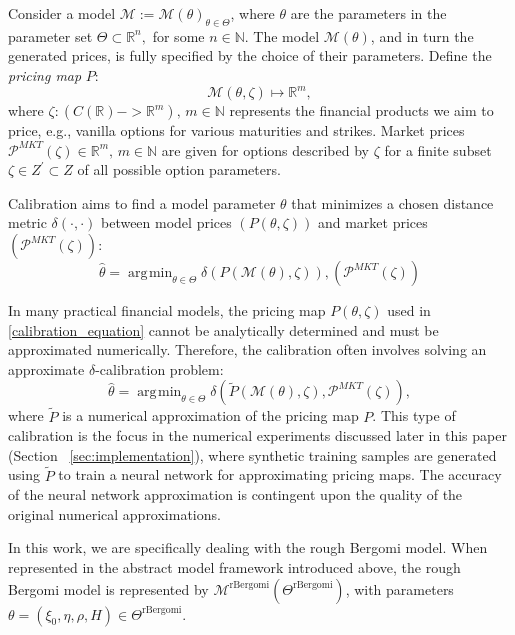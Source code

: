 \documentclass{article}
\theoremstyle{remark}
\DeclareMathOperator*{\argmin}{\arg\!\min}
\begin{document}
Consider a model $\mathcal{M} := \mathcal{M}(\theta)_{\theta \in \Theta}$, where $\theta$ are the parameters
in the parameter set $\Theta \subset \mathbb{R}^n,$ for some $n \in \mathbb{N}$.
The model $\mathcal{M}(\theta)$, and in turn the generated prices, is fully specified by the choice of their parameters.
Define the \emph{pricing map} $P$:
\begin{equation*}
\mathcal{M}(\theta, \zeta) \mapsto \mathbb{R}^m,
\end{equation*}
where $\zeta: (C(\mathbb{R}) -> \mathbb{R}^m), \,m \in \mathbb{N}$ represents the financial products we aim to price,
e.g., vanilla options for various maturities and strikes.
Market prices $\mathcal{P}^{MKT}(\zeta) \in \mathbb{R}^m, \, m \in \mathbb{N}$ are given for options described by $\zeta$ for a finite subset
$\zeta \in Z^\prime \subset Z$ of all possible option parameters.

Calibration aims to find a model parameter $\theta$ that minimizes a chosen distance metric $\delta(\cdot, \cdot)$
between model prices $\left( P(\theta, \zeta) \right)$
and market prices $\left(\mathcal{P}^{MKT}(\zeta) \right)$:
\begin{equation}\label{calibration_equation}
\widehat{\theta} = \argmin_{\theta \in \Theta} \delta\left( P(\mathcal{M}(\theta), \zeta) \right),
\left(\mathcal{P}^{MKT}(\zeta) \right)
\end{equation}

In many practical financial models, the pricing map $P(\theta, \zeta)$ used in \ref{calibration_equation} cannot be analytically determined
and must be approximated numerically.
Therefore, the calibration often involves solving an approximate $\delta$-calibration problem:
\begin{equation}\label{approximate_calibration_equation}
\widehat{\theta} = \argmin_{\theta \in \Theta} \delta\left( \tilde{P}(\mathcal{M}(\theta), \zeta), \mathcal{P}^{MKT}(\zeta) \right),
\end{equation}
where $\tilde{P}$ is a numerical approximation of the pricing map $P$.
This type of calibration is the focus in the numerical experiments discussed later in this paper (Section ~\ref{sec:implementation}),
where synthetic training samples are generated using $\tilde{P}$ to train a neural network for approximating pricing maps.
The accuracy of the neural network approximation is contingent upon the quality of the original numerical approximations.

In this work, we are specifically dealing with the rough Bergomi model.
When represented in the abstract model framework introduced above, the rough Bergomi model \cite{BFG15} is represented by
$\mathcal{M}^{\mathrm{rBergomi}}(\Theta^{\mathrm{rBergomi}})$,
with parameters $\theta = (\xi_0,\eta,\rho,H) \in \Theta^{\mathrm{rBergomi}}$.
\end{document}
